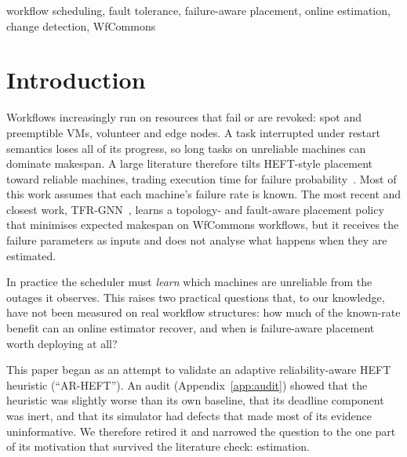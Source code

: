 \documentclass[conference]{IEEEtran}
\begin{document}
\begin{IEEEkeywords}
workflow scheduling, fault tolerance, failure-aware placement, online estimation, change detection, WfCommons
\end{IEEEkeywords}

\section{Introduction}
Workflows increasingly run on resources that fail or are revoked: spot and preemptible
VMs, volunteer and edge nodes. A task interrupted under restart semantics loses all of its
progress, so long tasks on unreliable machines can dominate makespan. A large literature
therefore tilts HEFT-style placement~\cite{topcuoglu2002heft} toward reliable machines,
trading execution time for failure probability~\cite{dogan2001trading,dogan2005biobjective,girault2008reliability}.
Most of this work assumes that each machine's failure rate is known. The most recent and
closest work, TFR-GNN~\cite{yang2026tfrgnn}, learns a topology- and fault-aware placement
policy that minimises expected makespan on WfCommons workflows, but it receives the failure
parameters as inputs and does not analyse what happens when they are estimated.

In practice the scheduler must \emph{learn} which machines are unreliable from the outages it
observes. This raises two practical questions that, to our knowledge, have not been
measured on real workflow structures: how much of the known-rate benefit can an online
estimator recover, and when is failure-aware placement worth deploying at all?

This paper began as an attempt to validate an adaptive reliability-aware HEFT heuristic
(``AR-HEFT''). An audit (Appendix~\ref{app:audit}) showed that the heuristic was slightly
worse than its own baseline, that its deadline component was inert, and that its
simulator had defects that made most of its evidence uninformative. We therefore retired
it and narrowed the question to the one part of its motivation that survived the
literature check: estimation.
\end{document}
